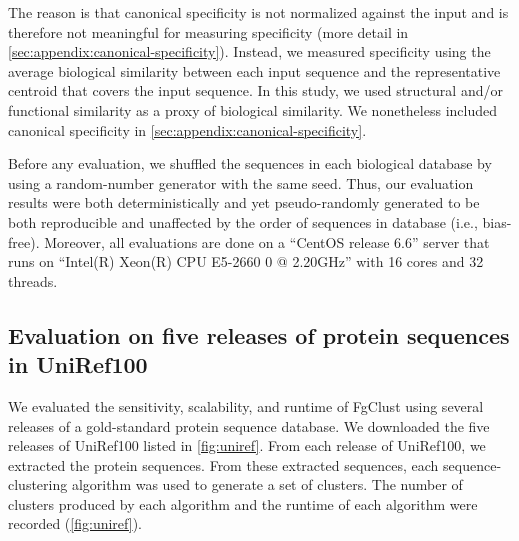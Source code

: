 \documentclass[11pt,letterpaper]{article}
\begin{document}
The reason is that canonical specificity is not normalized against the input and is therefore not meaningful for measuring specificity (more detail in \cref{sec:appendix:canonical-specificity}).
Instead, we measured specificity using the average biological similarity between each input sequence and the representative centroid that covers the input sequence.
In this study, we used structural and/or functional similarity as a proxy of biological similarity. %
We nonetheless included canonical specificity in \cref{sec:appendix:canonical-specificity}.

Before any evaluation, we shuffled the sequences in each biological database by using a random-number generator with the same seed.
Thus, our evaluation results were both deterministically and yet pseudo-randomly generated to be both reproducible and unaffected by the order of sequences in database (i.e., bias-free).
Moreover, all evaluations are done on a ``CentOS release 6.6'' server that runs on ``Intel(R) Xeon(R) CPU E5-2660 0 @ 2.20GHz'' with 16 cores and 32 threads.

\subsection{Evaluation on five releases of protein sequences in UniRef100}

We evaluated the sensitivity, scalability, and runtime of FgClust using several releases of a gold-standard protein sequence database.
We downloaded the five releases of UniRef100 \citep{suzek2007uniref} listed in \cref{fig:uniref}.
From each release of UniRef100, we extracted the protein sequences.
From these extracted sequences, each sequence-clustering algorithm was used to generate a set of clusters.
The number of clusters produced by each algorithm and the runtime of each algorithm were recorded (\cref{fig:uniref}).
\end{document}
